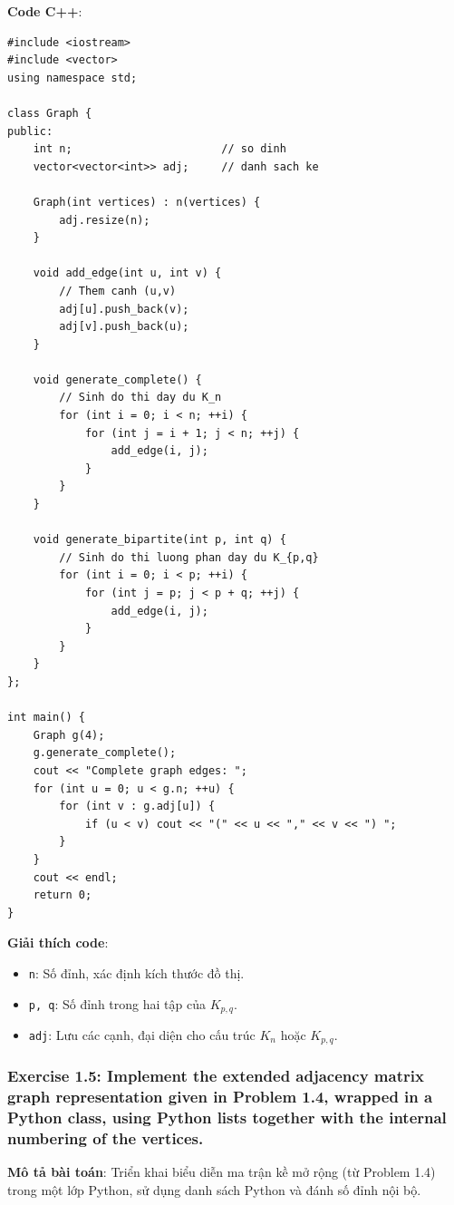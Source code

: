 \documentclass[a4paper,12pt]{article}
\begin{document}
\bigskip
\textbf{Code C++}:
\lstset{language=C++}
\begin{lstlisting}
#include <iostream>
#include <vector>
using namespace std;

class Graph {
public:
    int n;                       // so dinh
    vector<vector<int>> adj;     // danh sach ke

    Graph(int vertices) : n(vertices) {
        adj.resize(n);
    }

    void add_edge(int u, int v) {
        // Them canh (u,v)
        adj[u].push_back(v);
        adj[v].push_back(u);
    }

    void generate_complete() {
        // Sinh do thi day du K_n
        for (int i = 0; i < n; ++i) {
            for (int j = i + 1; j < n; ++j) {
                add_edge(i, j);
            }
        }
    }

    void generate_bipartite(int p, int q) {
        // Sinh do thi luong phan day du K_{p,q}
        for (int i = 0; i < p; ++i) {
            for (int j = p; j < p + q; ++j) {
                add_edge(i, j);
            }
        }
    }
};

int main() {
    Graph g(4);
    g.generate_complete();
    cout << "Complete graph edges: ";
    for (int u = 0; u < g.n; ++u) {
        for (int v : g.adj[u]) {
            if (u < v) cout << "(" << u << "," << v << ") ";
        }
    }
    cout << endl;
    return 0;
}
\end{lstlisting}

\textbf{Giải thích code}:
\begin{itemize}
    \item \texttt{n}: Số đỉnh, xác định kích thước đồ thị.
    \item \texttt{p, q}: Số đỉnh trong hai tập của \( K_{p,q} \).
    \item \texttt{adj}: Lưu các cạnh, đại diện cho cấu trúc \( K_n \) hoặc \( K_{p,q} \).
\end{itemize}

\subsubsection{Exercise 1.5: Implement the extended adjacency matrix graph representation given in Problem 1.4, wrapped in a Python class, using Python lists together with the internal numbering of the vertices.}
\textbf{Mô tả bài toán}: Triển khai biểu diễn ma trận kề mở rộng (từ Problem 1.4) trong một lớp Python, sử dụng danh sách Python và đánh số đỉnh nội bộ.
\end{document}
